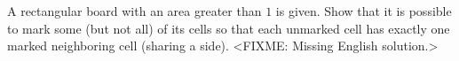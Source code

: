 \problem
A rectangular board with an area greater than $1$ is given.
Show that it is possible to mark some (but not all) of its cells so that each
unmarked cell has exactly one marked neighboring cell (sharing a side).
\solution
<FIXME: Missing English solution.>
\endproblem
